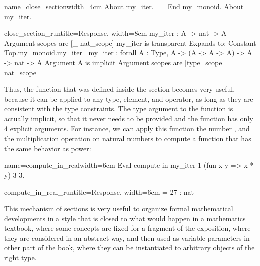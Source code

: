 \begin{coq}{name=close_section}{width=4cm}
About my_iter.
$~$
$~$
$~$
End my_monoid.
About my_iter.
$~$
$~$
$~$
$~$
\end{coq}
\begin{coqout}{close_section_run}{title=Response, width=8cm}
my_iter : A -> nat -> A
Argument scopes are [_ nat_scope]
my_iter is transparent
Expands to: Constant Top.my_monoid.my_iter
$~$
my_iter : forall A : Type, A -> (A -> A -> A) -> A -> nat -> A
Argument A is implicit
Argument scopes are [type_scope _ _ _ nat_scope]
\end{coqout}
Thus, the function  that was defined inside the section
becomes very useful, because it can be applied to any type, element,
and operator, as long as they are consistent with the type
constraints.  The type argument to the function  is
actually implicit, so that it never needs to be provided and the
function has only 4 explicit arguments.
For instance, we can apply this function the
number , and the multiplication operation on natural numbers
to compute a function that has the same behavior as power:

\begin{coq}{name=compute_in_real}{width=6cm}
Eval compute in my_iter 1
    (fun x y => x * y) 3 3.
\end{coq}
\begin{coqout}{compute_in_real_run}{title=Response, width=6cm}
= 27 : nat
\end{coqout}

This mechanism of sections is very useful to organize formal
mathematical developments in a style that is closed to what would
happen in a mathematics textbook, where some concepts are fixed for a
fragment of the exposition, where they are considered in an abstract
way, and then used as variable parameters in other part of the book,
where they can be instantiated to arbitrary objects of the right type.


